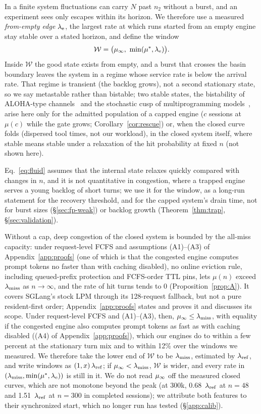 In a finite system fluctuations can carry $N$ past $n_2$ without a burst, and an experiment sees only escapes within its horizon. We therefore use a measured \emph{from-empty edge} $\lambda_{\mathrm{e}}$, the largest rate at which runs started from an empty engine stay stable over a stated horizon, and define the window
\begin{equation}\label{eq:window}
\mathcal W=\big(\mu_{\infty},\ \min(\mu^*,\lambda_{\mathrm{e}})\big).
\end{equation}
Inside $\mathcal W$ the good state exists from empty, and a burst that crosses the basin boundary leaves the system in a regime whose service rate is below the arrival rate. That regime is transient (the backlog grows), not a second stationary state, so we say metastable rather than bistable; two stable states, the bistability of ALOHA-type channels~\citep{carleial1975bistable} and the stochastic cusp of multiprogramming models~\citep{nelson1987stochastic}, arise here only for the admitted population of a capped engine ($c$ sessions at $\mu(c)$ while the gate grows; Corollary~\ref{cor:rescue}) or, when the closed curve folds (dispersed tool times, not our workload), in the closed system itself, where stable means stable under a relaxation of the hit probability at fixed $n$ (not shown here).

Eq.~\eqref{eq:fluid} assumes that the internal state relaxes quickly compared with changes in $n$, and it is not quantitative in congestion, where a trapped engine serves a young backlog of short turns; we use it for the window, as a long-run statement for the recovery threshold, and for the capped system's drain time, not for burst sizes (\S\ref{sec:fp-weak}) or backlog growth (Theorem~\ref{thm:trap}, \S\ref{sec:validation}).

Without a cap, deep congestion of the closed system is bounded by the all-miss capacity: under request-level FCFS and assumptions (A1)--(A3) of Appendix~\ref{app:proofs} (one of which is that the congested engine computes prompt tokens no faster than with caching disabled), no online eviction rule, including queued-prefix protection and FCFS-order TTL pins, lets $\mu(n)$ exceed $\lambda_{\mathrm{miss}}$ as $n\to\infty$, and the rate of hit turns tends to 0 (Proposition~\ref{prop:A}). It covers SGLang's stock LPM through its 128-request fallback, but not a pure resident-first order; Appendix~\ref{app:proofs} states and proves it and discusses its scope. Under request-level FCFS and (A1)--(A3), then, $\mu_{\infty}\le\lambda_{\mathrm{miss}}$, with equality if the congested engine also computes prompt tokens as fast as with caching disabled ((A4) of Appendix~\ref{app:proofs}), which our engines do to within a few percent at the stationary turn mix and to within 12\% over the windows we measured. We therefore take the lower end of $\mathcal W$ to be $\lambda_{\mathrm{miss}}$, estimated by $\lambda_{\mathrm{ref}}$, and write windows as $(1,x)\,\lambda_{\mathrm{ref}}$; if $\mu_{\infty}<\lambda_{\mathrm{miss}}$, $\mathcal W$ is wider, and every rate in $(\lambda_{\mathrm{miss}},\min(\mu^*,\lambda_{\mathrm{e}}))$ is still in it. We do not read $\mu_{\infty}$ off the measured closed curves, which are not monotone beyond the peak (at 300k, 0.68~$\lambda_{\mathrm{ref}}$ at $n=48$ and 1.51~$\lambda_{\mathrm{ref}}$ at $n=300$ in completed sessions); we attribute both features to their synchronized start, which no longer run has tested (\S\ref{app:calib}).

